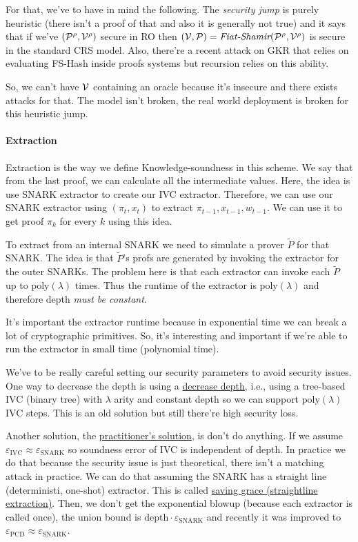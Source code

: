   For that, we've to have in mind the following.
  The \textit{security jump} is purely heuristic (there isn't a proof of that and also 
  it is generally not true) and it says that if we've $(\mathcal{P}^\rho, \mathcal{V}^\rho)$ secure in RO
  then $(\mathcal{V},\mathcal{P}) = \textit{Fiat-Shamir}(\mathcal{P}^\rho,\mathcal{V}^\rho)$ is secure in the standard 
  CRS model.
  Also, there're a recent attack on GKR that relies on evaluating FS-Hash inside proofs systems
  but recursion relies on this ability.

  So, we can't have $\mathcal{V}$ containing an oracle because it's insecure and
  there exists attacks for that.
  The model isn't broken, the real world deployment is broken for this 
  heuristic jump.

  \paragraph{Extraction}
  Extraction is the way we define Knowledge-soundness in this scheme.
  We say that from the last proof, we can calculate all the intermediate values.
  Here, the idea is use SNARK extractor to create our IVC extractor.
  Therefore, we can use our SNARK extractor using $(\pi_t,x_t)$ to extract $\pi_{t-1},x_{t-1},w_{t-1}$.
  We can use it to get proof $\pi_k$ for every $k$ using this idea.

  To extract from an internal SNARK we need to simulate a prover $\tilde{P}$ for 
  that SNARK.
  The idea is that $\tilde{P}$'s profs are generated by invoking the extractor 
  for the outer SNARKs.
  The problem here is that each extractor can invoke each $\tilde{P}$ up to
  $\text{poly}(\lambda)$ times.
  Thus the runtime of the extractor is $\text{poly}(\lambda)$ and therefore depth 
  \textit{must be constant}.

  It's important the extractor runtime because in exponential time we can break a lot 
  of cryptographic primitives. So, it's interesting and important if we're able to 
  run the extractor in small time (polynomial time).

  We've to be really careful setting our security parameters to avoid security issues.
  One way to decrease the depth is using a \underline{decrease depth}, i.e., using a tree-based 
  IVC (binary tree) with $\lambda$ arity and constant depth so we can support $\text{poly}(\lambda)$
  IVC steps.
  This is an old solution but still there're high security loss.

  Another solution, the \underline{practitioner's solution}, is don't do anything.
  If we assume $\varepsilon_{\text{IVC}} \approx \varepsilon_{\text{SNARK}}$ so soundness 
  error of IVC is independent of depth.
  In practice we do that because the security issue is just theoretical, there isn't a matching attack 
  in practice.
  We can do that assuming the SNARK has a straight line (deterministi, one-shot) extractor.
  This is called \underline{saving grace (straightline extraction)}.
  Then, we don't get the exponential blowup (because each extractor is called once), the 
  union bound is $\text{depth} \cdot \varepsilon_{\text{SNARK}}$ and recently it was improved to 
  $\varepsilon_{\text{PCD}} \approx \varepsilon_{\text{SNARK}}$.

